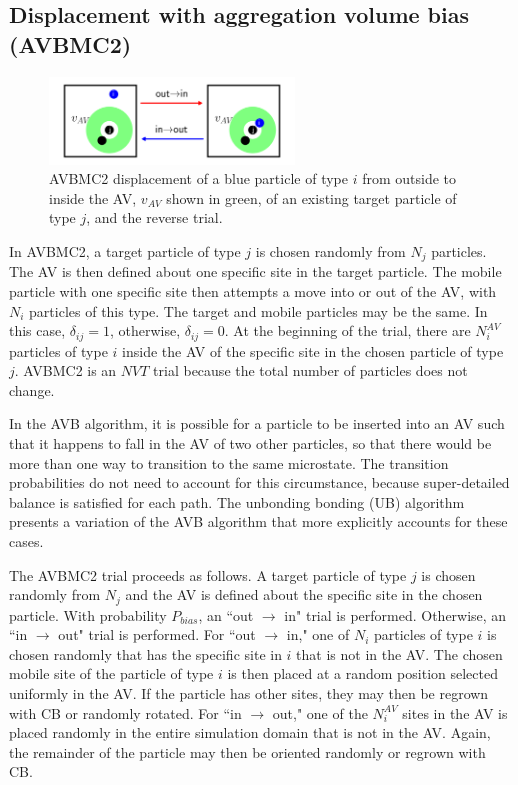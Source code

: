 \documentclass[
  9pt,
  bestpractices,
]{livecoms}
\begin{document}
\subsection{\label{sec:lhs_disp_avb2}Displacement with aggregation volume bias (AVBMC2)}

\begin{figure}
\begin{centering}
\includegraphics[width=6.5cm]{../figures/avb2.png}
\caption{
AVBMC2 displacement of a blue particle of type $i$ from outside to inside the AV, $v_{AV}$ shown in green, of an existing target particle of type $j$, and the reverse trial.
}
\label{fig:avbmc2}
\end{centering}
\end{figure}

In AVBMC2, a target particle of type $j$ is chosen randomly from $N_j$ particles.
The AV is then defined about one specific site in the target particle.
The mobile particle with one specific site then attempts a move into or out of the AV, with $N_i$ particles of this type.
The target and mobile particles may be the same.
In this case, $\delta_{ij}=1$, otherwise, $\delta_{ij}=0$.
At the beginning of the trial, there are $N_i^{AV}$ particles of type $i$ inside the AV of the specific site in the chosen particle of type $j$.
AVBMC2 is an $NVT$ trial because the total number of particles does not change.

In the AVB algorithm, it is possible for a particle to be inserted into an AV such that it happens to fall in the AV of two other particles, so that there would be more than one way to transition to the same microstate.
The transition probabilities do not need to account for this circumstance, because super-detailed balance is satisfied for each path.
The unbonding bonding (UB) algorithm \cite{wierzchowski_general-purpose_2001} presents a variation of the AVB algorithm that more explicitly accounts for these cases.

The AVBMC2 trial proceeds as follows.
A target particle of type $j$ is chosen randomly from $N_j$ and the AV is defined about the specific site in the chosen particle.
With probability $P_{bias}$, an ``out $\rightarrow$ in" trial is performed.
Otherwise, an ``in $\rightarrow$ out" trial is performed.
For ``out $\rightarrow$ in," one of $N_i$ particles of type $i$ is chosen randomly that has the specific site in $i$ that is not in the AV.
The chosen mobile site of the particle of type $i$ is then placed at a random position selected uniformly in the AV.
If the particle has other sites, they may then be regrown with CB or randomly rotated.
For ``in $\rightarrow$ out," one of the $N_i^{AV}$ sites in the AV is placed randomly in the entire simulation domain that is not in the AV.
Again, the remainder of the particle may then be oriented randomly or regrown with CB.
\end{document}
